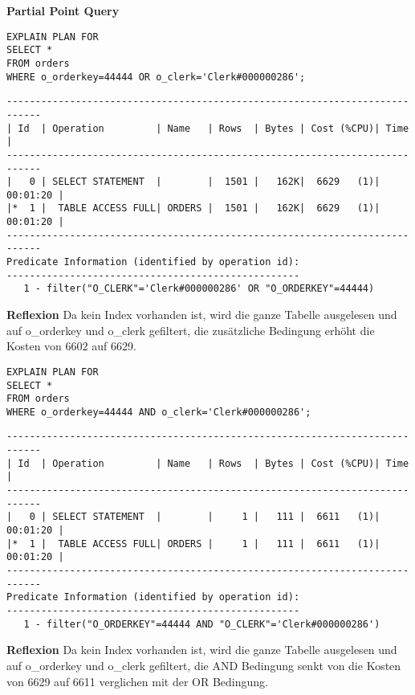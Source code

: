 \documentclass[10pt]{article}
\begin{document}
\newpage
\textbf{Partial Point Query}
\begin{lstlisting}[style=sql]
EXPLAIN PLAN FOR
SELECT *
FROM orders
WHERE o_orderkey=44444 OR o_clerk='Clerk#000000286';
\end{lstlisting}
\begin{lstlisting}[style=queryexecutionplan]
----------------------------------------------------------------------------
| Id  | Operation         | Name   | Rows  | Bytes | Cost (%CPU)| Time     |
----------------------------------------------------------------------------
|   0 | SELECT STATEMENT  |        |  1501 |   162K|  6629   (1)| 00:01:20 |
|*  1 |  TABLE ACCESS FULL| ORDERS |  1501 |   162K|  6629   (1)| 00:01:20 |
----------------------------------------------------------------------------
Predicate Information (identified by operation id):
---------------------------------------------------
   1 - filter("O_CLERK"='Clerk#000000286' OR "O_ORDERKEY"=44444)
\end{lstlisting}
\textbf{Reflexion} \newline
Da kein Index vorhanden ist, wird die ganze Tabelle ausgelesen und auf o\_orderkey und o\_clerk gefiltert, die zusätzliche Bedingung erhöht die Kosten von 6602 auf 6629.

\begin{lstlisting}[style=sql]
EXPLAIN PLAN FOR
SELECT *
FROM orders
WHERE o_orderkey=44444 AND o_clerk='Clerk#000000286';
\end{lstlisting}
\begin{lstlisting}[style=queryexecutionplan]
----------------------------------------------------------------------------
| Id  | Operation         | Name   | Rows  | Bytes | Cost (%CPU)| Time     |
----------------------------------------------------------------------------
|   0 | SELECT STATEMENT  |        |     1 |   111 |  6611   (1)| 00:01:20 |
|*  1 |  TABLE ACCESS FULL| ORDERS |     1 |   111 |  6611   (1)| 00:01:20 |
----------------------------------------------------------------------------
Predicate Information (identified by operation id):
---------------------------------------------------
   1 - filter("O_ORDERKEY"=44444 AND "O_CLERK"='Clerk#000000286')
\end{lstlisting}
\textbf{Reflexion} \newline
Da kein Index vorhanden ist, wird die ganze Tabelle ausgelesen und auf o\_orderkey und o\_clerk gefiltert, die AND Bedingung senkt von die Kosten von 6629 auf 6611 verglichen mit der OR Bedingung.
\end{document}
